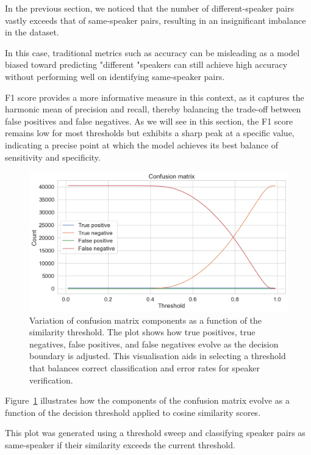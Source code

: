 \documentclass[conference]{IEEEtran}
\begin{document}
In the previous section, we noticed that the number of different-speaker pairs vastly exceeds that of same-speaker pairs, resulting in an insignificant imbalance in the dataset.

In this case, traditional metrics such as accuracy can be misleading as a model biased toward predicting "different "speakers can still achieve high accuracy without performing well on identifying same-speaker pairs. 

F1 score provides a more informative measure in this context,  as it captures the harmonic mean of precision and recall, thereby balancing the trade-off between false positives and false negatives. As we will see in this section, the F1 score remains low for most thresholds but exhibits a sharp peak at a specific value, indicating a precise point at which the model achieves its best balance of sensitivity and specificity. 


\begin{figure}[H]
	\centering
	\includegraphics[width=0.7\linewidth]{img/img-confusion-matrix}
	\caption{Variation of confusion matrix components as a function of the similarity threshold. The plot shows how true positives, true negatives, false positives, and false negatives evolve as the decision boundary is adjusted. This visualisation aids in selecting a threshold that balances correct classification and error rates for speaker verification.}
	\label{fig:img-confusion-matrix}
\end{figure}


Figure~\ref{fig:img-confusion-matrix} illustrates how the components of the confusion matrix evolve as a function of the decision threshold applied to cosine similarity scores.

This plot was generated using a threshold sweep and classifying speaker pairs as same-speaker if their similarity exceeds the current threshold.
\end{document}
